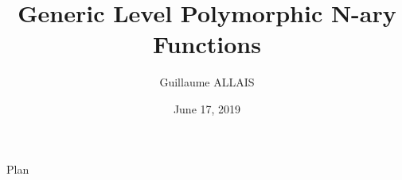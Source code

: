\documentclass[slidestop,compress,9pt]{beamer}
\title{Generic Level Polymorphic N-ary Functions}
\author{Guillaume ALLAIS}
\institute{SPLS @ LFCS}
\date[Jun 17]{June 17, 2019}
\begin{document}
\begin{frame}
\maketitle
\end{frame}

\begin{frame}{Plan}
\end{frame}
\end{document}

